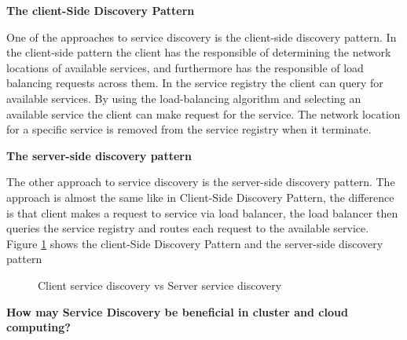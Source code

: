 \textbf{The client-Side Discovery Pattern}

One of the approaches to service discovery is the client-side discovery pattern. In the client-side pattern the client has the responsible of determining the network locations of available services, and furthermore has the responsible of load balancing requests across them. In the service registry the client can query for available services. By using the load-balancing algorithm and selecting an available service the client can make request for the service. The network location for a specific service is removed from the service registry when it terminate.

\textbf{The server-side discovery pattern}

The other approach to service discovery is the server-side discovery pattern. The approach is almost the same like in Client-Side Discovery Pattern, the difference is that client makes a request to service via load balancer, the load balancer then queries the service registry and routes each request to the available service. Figure \ref{fig:ClienServerService} shows the client-Side Discovery Pattern and the server-side discovery pattern  



\begin{figure}[bth]
	\centering
	\qquad
	\caption{Client service discovery vs Server service discovery }
	\label{fig:ClienServerService}
\end{figure}



\textbf{How may Service Discovery be beneficial in cluster and cloud computing?}  

